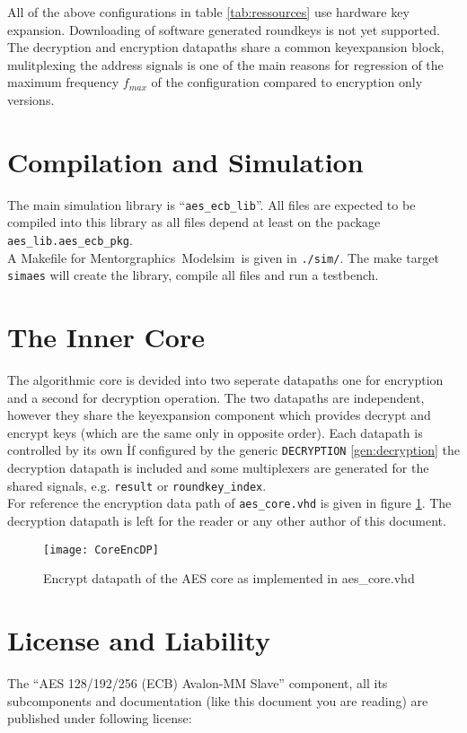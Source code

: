 \documentclass{ruschidoc}
\begin{document}
All of the above configurations in table \ref{tab:ressources} use hardware key
expansion. Downloading of software generated roundkeys is not yet supported. The
decryption and encryption datapaths share a common keyexpansion block, mulitplexing
the address signals is one of the main reasons for regression of the maximum
frequency $f_{max}$ of the configuration compared to encryption only versions. 

\section{Compilation and Simulation}
\label{sec:compilation}
The main simulation library is ``\texttt{aes\_ecb\_lib}''. All files are expected to be
compiled into this library as all files depend at least on the package
\texttt{aes\_lib.aes\_ecb\_pkg}. \\
A Makefile for Mentorgraphics\rtm\ Modelsim\rtm\ is given in \texttt{./sim/}. The
make target \texttt{simaes} will create the library, compile all files and run a
testbench.\\

\section{The Inner Core}
\label{sec:core}
The algorithmic core is devided into two seperate datapaths one for encryption and a
second for decryption operation. The two datapaths are independent, however they
share the keyexpansion component which provides decrypt and encrypt keys (which are
the same only in opposite order). Each datapath is controlled by its own \FSM\.  If
configured by the generic \texttt{DECRYPTION} \ref{gen:decryption} the decryption
datapath is included and some multiplexers are generated for the shared signals,
e.g. \texttt{result} or \texttt{roundkey\_index}.\\
For reference the encryption data path of \texttt{aes\_core.vhd} is given in figure
\ref{fig:aescore}. The decryption datapath is left for the reader or any other author
of this document.
\begin{figure}[!ht]
  \centering
  \texttt{[image: CoreEncDP]}
  \caption{Encrypt datapath of the AES core as implemented in aes\_core.vhd}
  \label{fig:aescore}
\end{figure}


\newpage
\section{License and Liability}
\label{sec:license}
The ``AES 128/192/256 (ECB) Avalon\rtm-MM Slave'' component, all its subcomponents
and documentation (like this document you are reading) are published under following
license:\\
\end{document}
